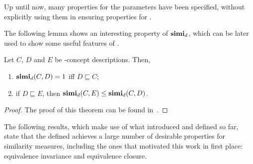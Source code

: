   Up until now, many properties for the parameters have been specified, without explicitly using them in ensuring properties for \simi.

  The following lemma shows an interesting property of \(\mathbf{simi}_d\), which can be later used to show some useful features of \simi.

  \begin{lemma}
    \label{lem:simid}
    Let \(C\), \(D\) and \(E\) be \elh-concept descriptions.
    Then,
    \begin{enumerate}
      \item \(\mathbf{simi}_d(C,D) = 1\) iff \(D \sqsubseteq C\);
      \item if \(D \sqsubseteq E\), then \(\mathbf{simi}_d(C,E) \le \mathbf{simi}_d(C,D)\).
    \end{enumerate}
  \end{lemma}
  \begin{proof}
    The proof of this theorem can be found in~\cite{LeTu12}.
  \end{proof}

  The following results, which make use of what introduced and defined so far, state that the defined \csm achieves a large number of desirable properties for similarity measures, including the ones that motivated this work in first place: equivalence invariance and equivalence closure.

